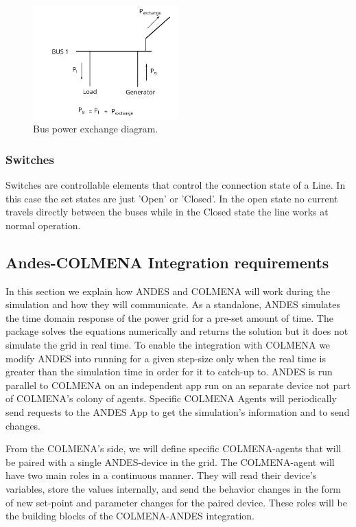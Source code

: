 \documentclass{article}
\begin{document}
\begin{figure}[!htb]
    \centering
    \includegraphics[width=0.5\textwidth]{pictures/busdiagram.png}
    \caption{Bus power exchange diagram.}
    \label{pic:bus_diagram}
\end{figure} 

\subsubsection*{Switches}
Switches are controllable elements that control the connection state of a Line. In this case the set states are just 'Open' or 'Closed'. In the open state no current travels directly between the buses while in the Closed state the line works at normal operation. 

\subsection{Andes-COLMENA Integration requirements}

In this section we explain how ANDES and COLMENA will work during the simulation and how they will communicate. As a standalone, ANDES simulates the time domain response of the power grid for a pre-set amount of time. The package solves the equations numerically and returns the solution but it does not simulate the grid in real time. To enable the integration with COLMENA we modify ANDES into running for a given step-size only when the real time is greater than the simulation time in order for it to catch-up to. ANDES is run parallel to COLMENA on an independent app run on an separate device not part of COLMENA's colony of agents. Specific COLMENA Agents will periodically send requests to the ANDES App to get the simulation's information and to send changes.   

From the COLMENA's side, we will define specific COLMENA-agents that will be paired with a single ANDES-device in the grid. The COLMENA-agent will have two main roles in a continuous manner. They will read their device's variables, store the values internally, and send the behavior changes in the form of new set-point and parameter changes for the paired device. These roles will be the building blocks of the COLMENA-ANDES integration.      
\end{document}
